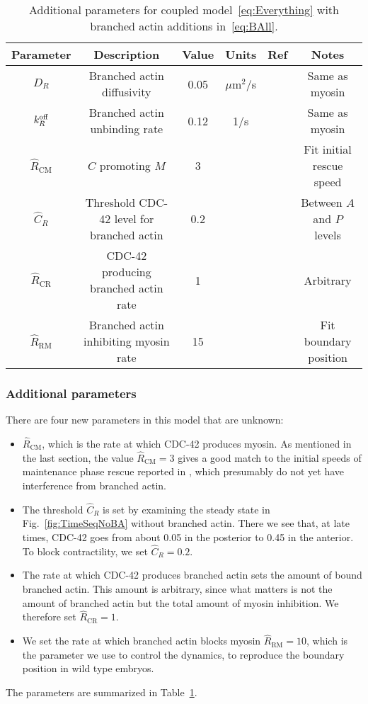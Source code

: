 \documentclass[11pt]{article}
\newcommand{\6}[1]{#1_{\text{6}}}
\newcommand{\3}[1]{#1_{\text{3}}}
\begin{document}
\begin{table}
\begin{small}
\centering
\begin{tabular}{|c|c|c|c|c|c|}\hline
Parameter & Description & Value & Units & Ref & Notes \\ \hline
$D_R$ & Branched actin diffusivity & 0.05 & $\mu$m$^2$/s & & Same as myosin \\
$k^\text{off}_R$ & Branched actin unbinding rate & 0.12 & 1/s & & Same as myosin \\ \hline
$\hat R_\text{CM}$ & $C$ promoting $M$ & 3 & &  \cite[Fig.~7D]{tse2012rhoa} & Fit initial rescue speed\\ 
$\hat C_R$ & Threshold CDC-42 level for branched actin & 0.2 & & & Between $A$ and $P$ levels\\
$\hat R_\text{CR}$ & CDC-42 producing branched actin rate  & 1 & & & Arbitrary\\ 
$\hat R_\text{RM}$ & Branched actin inhibiting myosin rate & 15 & & & Fit boundary position\\  \hline
\end{tabular}
\caption{\label{tab:paramsBR} Additional parameters for coupled model\ \eqref{eq:Everything} with branched actin additions in\ \eqref{eq:BAll}.}
\end{small}
\end{table}


\subsubsection{Additional parameters}
There are four new parameters in this model that are unknown: 
\begin{itemize}
\item $\hat{R}_\text{CM}$, which is the rate at which CDC-42 produces myosin. As mentioned in the last section, the value $\hat R_\text{CM}=3$ gives a good match to the initial speeds of maintenance phase rescue reported in \cite[Fig.~7D]{tse2012rhoa}, which presumably do not yet have interference from branched actin.
\item The threshold $\hat C_R$ is set by examining the steady state in Fig.\ \ref{fig:TimeSeqNoBA} without branched actin. There we see that, at late times, CDC-42 goes from about 0.05 in the posterior to 0.45 in the anterior. To block contractility, we set $\hat C_R=0.2$. 
\item The rate at which CDC-42 produces branched actin sets the amount of bound branched actin. This amount is arbitrary, since what matters is not the amount of branched actin but the total amount of myosin inhibition. We therefore set $\hat R_\text{CR}=1$.
\item We set the rate at which branched actin blocks myosin $\hat R_\text{RM}=10$, which is the parameter we use to control the dynamics, to reproduce the boundary position in wild type embryos. 
\end{itemize}
The parameters are summarized in Table\ \ref{tab:paramsBR}. 





\end{document}
